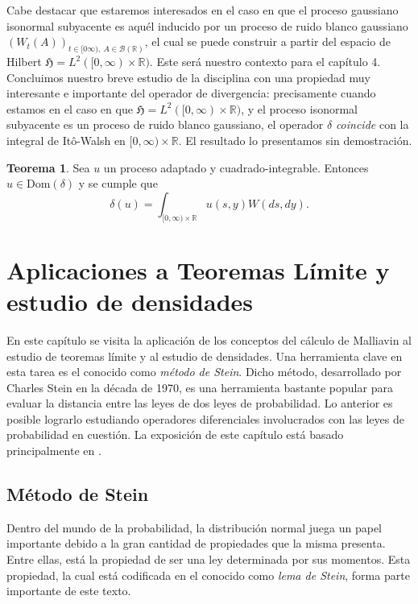 \documentclass[letterpaper,twoside,12pt]{book}
\newcommand{\R}{\mathbb{R}}
\newcommand{\B}{\mathcal{B}}
\newcommand{\1}{\mathds{1}}
\theoremstyle{definition}
\theoremstyle{definition}
\newtheorem{teo}{Teorema}
\theoremstyle{remark}
\theoremstyle{definition}
\theoremstyle{definition}
\theoremstyle{definition}
\theoremstyle{definition}
\theoremstyle{definition}
\begin{document}
Cabe destacar que estaremos interesados en el caso en que el proceso gaussiano isonormal subyacente es aquél inducido por un proceso de ruido blanco gaussiano $(W_t(A))_{t\in [0\infty), \ A\in \B(\R)}$, el cual se puede construir a partir del espacio de Hilbert $\mathfrak{H}=L^{2}([0,\infty)\times \R)$. Este será nuestro contexto para el capítulo 4. Concluimos nuestro breve estudio de la disciplina con una propiedad muy interesante e importante del operador de divergencia: precisamente cuando estamos en el caso en que $\mathfrak{H}=L^2([0,\infty)\times\R)$, y el proceso isonormal subyacente es un proceso de ruido blanco gaussiano, el operador $\delta$ \textit{coincide} con la integral de Itô-Walsh en $[0,\infty)\times\R$. El resultado lo presentamos sin demostración.

\begin{teo} 
 Sea $u$ un proceso adaptado y cuadrado-integrable. Entonces $u\in \text{Dom}(\delta)$ y se cumple que 
 \[
 \delta(u)=\int_{[0,\infty)\times \R}^{}u(s,y)W(ds,dy).
 \]
 \end{teo}
 
 
 \chapter{Aplicaciones a Teoremas Límite y estudio de densidades}
En este capítulo se visita la aplicación de los conceptos del cálculo de Malliavin al estudio de teoremas límite y al estudio de densidades. 
Una herramienta clave en esta tarea es el conocido como \textit{método de Stein}. 
Dicho método, desarrollado por Charles Stein en la década de 1970, es una herramienta bastante popular para evaluar la distancia entre las leyes de dos leyes de probabilidad. Lo anterior es posible lograrlo estudiando operadores diferenciales involucrados con las leyes de probabilidad en cuestión. La exposición de este capítulo está basado principalmente en \cite[capitulo 4]{Nourdin_Peccati_2012}. 

\section{Método de Stein}

Dentro del mundo de la probabilidad, la distribución normal juega un papel importante debido a la gran cantidad de propiedades que la misma presenta. Entre ellas, está la propiedad de ser una ley determinada por sus momentos. Esta propiedad, la cual está codificada en el conocido como \textit{lema de Stein}, forma parte importante de este texto. 
\end{document}
